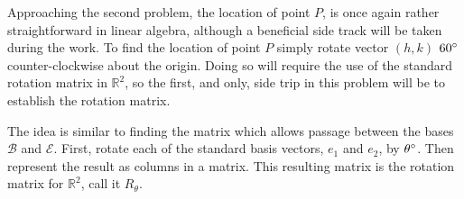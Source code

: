 \documentclass[12pt,letter]{article}
\begin{document}
Approaching the second problem, the location of point $P$, is once again rather straightforward in linear algebra, although a beneficial side track will be taken during the work. To find the location of point $P$ simply rotate vector $(h,k)$ $60\degree$ counter-clockwise about the origin. Doing so will require the use of the standard rotation matrix in $\mathbb{R}^2$, so the first, and only, side trip in this problem will be to establish the rotation matrix.

The idea is similar to finding the matrix which allows passage between the bases $\mathcal{B}$ and $\mathcal{E}$. First, rotate each of the standard basis vectors, $e_1$ and $e_2$, by $\theta\degree$. Then represent the result as columns in a matrix. This resulting matrix is the rotation matrix for $\mathbb{R}^2$, call it $R_\theta$. 
\end{document}

